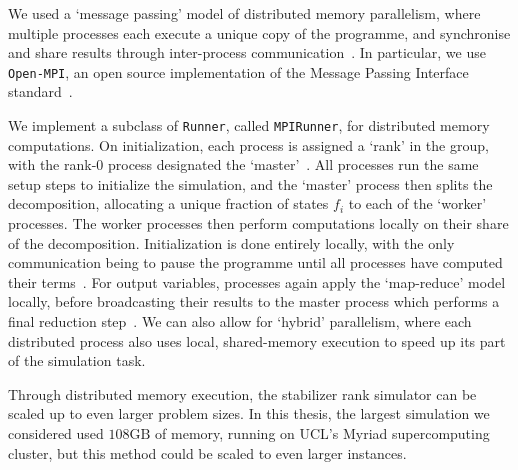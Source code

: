 We used a `message passing' model of distributed memory parallelism, where multiple processes each execute a unique copy of the programme, and synchronise and share results through inter-process communication~\cite{Kessler2007}. In particular, we use \texttt{Open-MPI}, an open source implementation of the Message Passing Interface standard~\cite{OpenMPI,MPIForum}.\par
We implement a subclass of \texttt{Runner}, called \texttt{MPIRunner}, for distributed memory computations. On initialization, each process is assigned a `rank' in the group, with the rank-0 process designated the `master'~\cite{MPIForum}. All processes run the same setup steps to initialize the simulation, and the `master' process then splits the decomposition, allocating a unique fraction of states $f_{i}$ to each of the `worker' processes. The worker processes then perform computations locally on their share of the decomposition. Initialization is done entirely locally, with the only communication being to pause the programme until all processes have computed their terms~\cite{MPIForum}. For output variables, processes again apply the `map-reduce' model locally, before broadcasting their results to the master process which performs a final reduction step~\cite{MPIForum}. We can also allow for `hybrid' parallelism, where each distributed process also uses local, shared-memory execution to speed up its part of the simulation task.\par
Through distributed memory execution, the stabilizer rank simulator can be scaled up to even larger problem sizes. In this thesis, the largest simulation we considered used $108\mathrm{GB}$ of memory, running on UCL's Myriad supercomputing cluster, but this method could be scaled to even larger instances.
